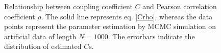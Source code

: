 \documentclass[%
 reprint,
 amsmath,amssymb,
 aps,
]{revtex4-1}
\begin{document}
\begin{figure}[H]
\begin{center}
\caption{Relationship between coupling coefficient $C$ and Pearson correlation coefficient $\rho$.  The solid line represents eq. \ref{Crho}, whereas the data points represent the parameter estimation by MCMC simulation on artificial data of length $N=1000$.  The errorbars indicate the distribution of estimated $C$s.}\label{fig:corr}
\end{center}
\end{figure}
\end{document}

